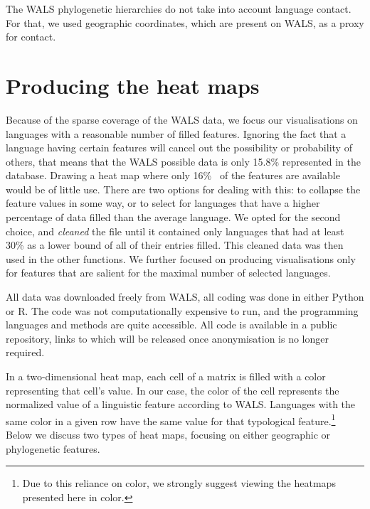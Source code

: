 \documentclass[11pt]{article}
\begin{document}
The WALS phylogenetic hierarchies do not take into account language contact. For that, we used geographic coordinates, which are present on WALS, as a proxy for contact. 



\section{Producing the heat maps}

Because of the sparse coverage of the WALS data, we focus our visualisations on languages with a reasonable number of filled features.
Ignoring the fact that a language having certain features will cancel out the possibility or probability of others, that means that the WALS possible data is only 15.8\% represented in the database. %
Drawing a heat map where only 16\%~ of the features are available would be of little use. There are two options for dealing with this: to collapse the feature values in some way, or to select for languages that have a higher percentage of data filled than the average language. We opted for the second choice, and \emph{cleaned}  the file until it contained only languages that had at least 30\% as a lower bound of all of their entries filled. This cleaned data was then used in the other functions. We further focused on producing visualisations only for features that are salient for the maximal number of selected languages.

All data was downloaded freely from WALS, all coding was done in either Python or R. The code was not computationally expensive to run, and the programming languages and methods are quite accessible. All code is available in a public repository, links to which will be released once anonymisation is no longer required.

In a two-dimensional heat map, each cell of a matrix is filled with a color representing that cell's value. In our case, the color of the cell represents the normalized value of a linguistic feature according to WALS. Languages with the same color in a given row have the same value for that typological feature.\footnote{Due to this reliance on color, we strongly suggest viewing the heatmaps presented here in color.} Below we discuss two types of heat maps, focusing on either geographic or phylogenetic features.
\end{document}
